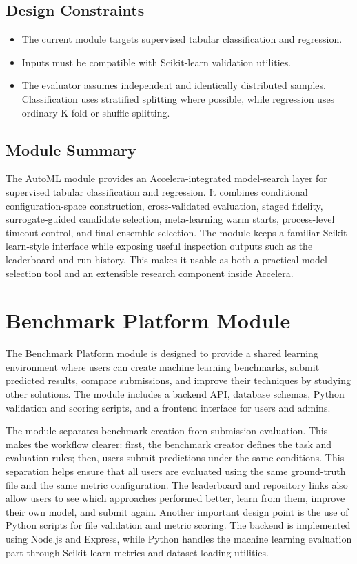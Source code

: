 \documentclass[12pt,a4paper]{report}
\begin{document}
\subsection{Design Constraints}

\begin{itemize}
  \item The current module targets supervised tabular classification and
  regression.
  \item Inputs must be compatible with Scikit-learn validation utilities.
  \item The evaluator assumes independent and identically distributed samples.
  Classification uses stratified splitting where possible, while regression uses
  ordinary K-fold or shuffle splitting.
\end{itemize}

\subsection{Module Summary}
\noindent The AutoML module provides an Accelera-integrated model-search layer for
supervised tabular classification and regression. It combines conditional
configuration-space construction, cross-validated evaluation, staged fidelity,
surrogate-guided candidate selection, meta-learning warm starts, process-level
timeout control, and final ensemble selection. The module keeps a familiar
Scikit-learn-style interface while exposing useful inspection outputs such as
the leaderboard and run history. This makes it usable as both a practical model
selection tool and an extensible research component inside Accelera.




\section{Benchmark Platform Module}
\noindent The Benchmark Platform module is designed to provide a shared learning
environment where users can create machine learning benchmarks, submit
predicted results, compare submissions, and improve their techniques by studying
other solutions. The module includes a backend API, database schemas, Python
validation and scoring scripts, and a frontend interface for users and admins.

\noindent The module separates benchmark creation from submission evaluation.
This makes the workflow clearer: first, the benchmark creator defines the task
and evaluation rules; then, users submit predictions under the same conditions.
This separation helps ensure that all users are evaluated using the same
ground-truth file and the same metric configuration. The leaderboard and
repository links also allow users to see which approaches performed better,
learn from them, improve their own model, and submit again. Another important
design point is the use of Python scripts for file validation and metric
scoring. The backend is implemented using Node.js and Express, while Python
handles the machine learning evaluation part through Scikit-learn metrics and
dataset loading utilities.
\end{document}

